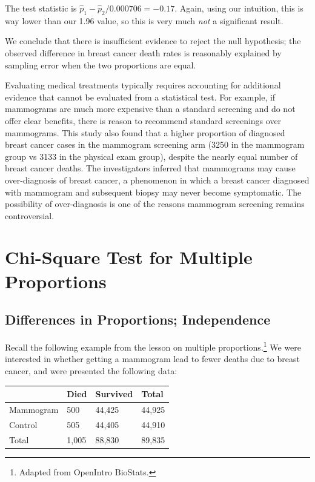 \documentclass[
  letterpaper,
  DIV=11,
  numbers=noendperiod,
  oneside]{scrreprt}
\begin{document}
The test statistic is \(\hat p_1 - \hat p_2 / 0.000706 = -0.17\). Again,
using our intuition, this is way lower than our 1.96 value, so this is
very much \emph{not} a significant result.

We conclude that there is insufficient evidence to reject the null
hypothesis; the observed difference in breast cancer death rates is
reasonably explained by sampling error when the two proportions are
equal.

Evaluating medical treatments typically requires accounting for
additional evidence that cannot be evaluated from a statistical test.
For example, if mammograms are much more expensive than a standard
screening and do not offer clear benefits, there is reason to recommend
standard screenings over mammograms. This study also found that a higher
proportion of diagnosed breast cancer cases in the mammogram screening
arm (3250 in the mammogram group vs 3133 in the physical exam group),
despite the nearly equal number of breast cancer deaths. The
investigators inferred that mammograms may cause over-diagnosis of
breast cancer, a phenomenon in which a breast cancer diagnosed with
mammogram and subsequent biopsy may never become symptomatic. The
possibility of over-diagnosis is one of the reasons mammogram screening
remains controversial.

\hypertarget{chi-square-test-for-multiple-proportions}{%
\chapter{Chi-Square Test for Multiple
Proportions}\label{chi-square-test-for-multiple-proportions}}

\hypertarget{differences-in-proportions-independence}{%
\section{Differences in Proportions;
Independence}\label{differences-in-proportions-independence}}

Recall the following example from the lesson on multiple
proportions.\footnote{Adapted from OpenIntro BioStats.} We were
interested in whether getting a mammogram lead to fewer deaths due to
breast cancer, and were presented the following data:

\begin{longtable}[]{@{}llll@{}}
\toprule\noalign{}
& Died & Survived & Total \\
\midrule\noalign{}
\endhead
\bottomrule\noalign{}
\endlastfoot
Mammogram & 500 & 44,425 & 44,925 \\
Control & 505 & 44,405 & 44,910 \\
Total & 1,005 & 88,830 & 89,835 \\
\end{longtable}
\end{document}
